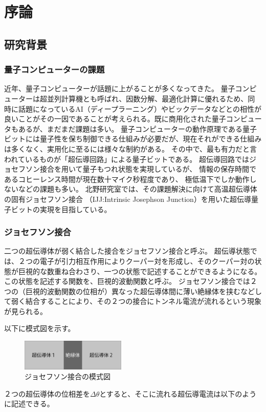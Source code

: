 \chapter{序論}


\section{研究背景}
\subsection*{量子コンピューターの課題}
近年、量子コンピューターが話題に上がることが多くなってきた。
量子コンピューターは超並列計算機とも呼ばれ、因数分解、最適化計算に優れるため、同時に話題になっているAI（ディープラーニング）やビックデータなどとの相性が良いことがその一因であることが考えられる。既に商用化された量子コンピュータもあるが、まだまだ課題は多い。
量子コンピューターの動作原理である量子ビットには量子性を保ち制御できる仕組みが必要だが、現在それができる仕組みは多くなく、実用化に至るには様々な制約がある。
その中で、最も有力だと言われているものが「超伝導回路」による量子ビットである。
超伝導回路ではジョセフソン接合を用いて量子もつれ状態を実現しているが、
情報の保存時間であるコヒーレンス時間が現在数十マイク秒程度であり、
極低温下でしか動作しないなどの課題も多い。
北野研究室では、その課題解決に向けて高温超伝導体の固有ジョセフソン接合
（IJJ:Intrinsic Josephson Junction）を用いた超伝導量子ビットの実現を目指している。

\subsection*{ジョセフソン接合}
二つの超伝導体が弱く結合した接合をジョセフソン接合と呼ぶ。
超伝導状態では、２つの電子が引力相互作用によりクーパー対を形成し、そのクーパー対の状態が巨視的な数重ね合わさり、一つの状態で記述することができるようになる。
この状態を記述する関数を、巨視的波動関数と呼ぶ。
ジョセフソン接合では２つの（巨視的波動関数の位相が）異なった超伝導体間に薄い絶縁体を挟むなどして弱く結合することにより、その２つの接合にトンネル電流が流れるという現象が見られる。

以下に模式図を示す。
\vspace{10 mm}

\begin{figure}[h]
  \begin{center}
    \includegraphics[width=5cm]{./image/JJ.png}
    \caption{ジョセフソン接合の模式図}
    \label{fig:JJ}
  \end{center}
\end{figure}
２つの超伝導体の位相差を$ \Delta \theta $とすると、そこに流れる超伝導電流は以下のように記述できる。

